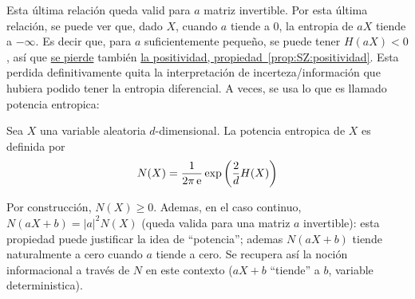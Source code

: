 %
Esta  \'ultima relaci\'on  queda valid  para  $a$ matriz  invertible.  Por  esta
\'ultima  relaci\'on, se puede  ver que,  dado $X$,  cuando $a$  tiende a  0, la
entropia de  $a X$ tiende a  $-\infty$.  Es decir que,  para $a$ suficientemente
peque\~no,  se  puede  tener $H(a  X)  <  0$,  as\'i que  \underline{se  pierde}
tambi\'en \underline{la positividad, propiedad~\ref{prop:SZ:positividad}}.  Esta
perdida definitivamente quita la interpretaci\'on de incerteza/informaci\'on que
hubiera podido tener la entropia diferencial.  A veces, se usa lo que es llamado
potencia entropica:
%
\begin{definicion}
  Sea $X$ una  variable aleatoria $d$-dimensional. La potencia  entropica de $X$
  es definida por
  \[
  N(X) = \frac{1}{2 \pi \operatorname{e}} \exp\left( \frac2d H(X) \right)
  \]
\end{definicion}
%
\noindent Por construcci\'on,  $N(X) \ge 0$.  Ademas, en  el caso continuo, $N(a
X+b) = |a|^2 N(X)$ (queda valida para una matriz $a$ invertible): esta propiedad
puede justificar la idea de  ``potencia''; ademas $N(a X+b)$ tiende naturalmente
a cero cuando $a$ tiende a  cero.  Se recupera as\'i la noci\'on informacional a
trav\'es  de  $N$ en  este  contexto  ($a X  +  b$  ``tiende''  a $b$,  variable
deterministica).

